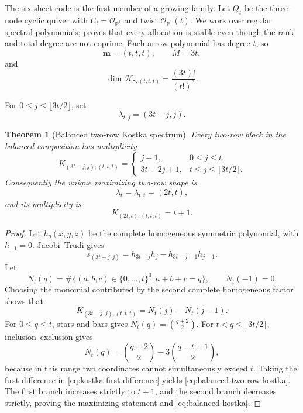 \documentclass[11pt]{article}
\newtheorem{theorem}{Theorem}[section]
\theoremstyle{definition}
\theoremstyle{remark}
\newcommand{\Pp}{\mathbb P}
\newcommand{\cH}{\mathcal H}
\newcommand{\cO}{\mathcal O}
\begin{document}
The six-sheet code is the first member of a growing family.  Let $Q_t$ be the three-node cyclic quiver with $U_i=\cO_{\Pp^1}$ and twist $\cO_{\Pp^1}(t)$.  We work over regular spectral polynomials;  proves that every allocation is stable even though the rank and total degree are not coprime.  Each arrow polynomial has degree $t$, so
\begin{equation}\label{eq:balanced-composition}
 \boldsymbol m=(t,t,t),
 \qquad M=3t,
\end{equation}
and
\begin{equation}\label{eq:balanced-sheet-dim}
 \dim\cH_{\gamma,(t,t,t)}
 =\frac{(3t)!}{(t!)^3}.
\end{equation}

For $0\leq j\leq\lfloor3t/2\rfloor$, set
\begin{equation}\label{eq:balanced-two-row-shape}
 \lambda_{t,j}=(3t-j,j).
\end{equation}

\begin{theorem}[Balanced two-row Kostka spectrum]\label{thm:balanced-two-row}
Every two-row block in the balanced composition has multiplicity
\begin{equation}\label{eq:balanced-two-row-kostka}
 K_{(3t-j,j),(t,t,t)}
 =
 \begin{cases}
  j+1,&0\leq j\leq t,\\
  3t-2j+1,&t\leq j\leq\lfloor3t/2\rfloor.
 \end{cases}
\end{equation}
Consequently the unique maximizing two-row shape is
\begin{equation}\label{eq:balanced-lambda}
 \lambda_t=\lambda_{t,t}=(2t,t),
\end{equation}
and its multiplicity is
\begin{equation}\label{eq:balanced-kostka}
 K_{(2t,t),(t,t,t)}=t+1.
\end{equation}
\end{theorem}

\begin{proof}
Let $h_q(x,y,z)$ be the complete homogeneous symmetric polynomial, with $h_{-1}=0$.  Jacobi--Trudi gives
\[
 s_{(3t-j,j)}
 =h_{3t-j}h_j-h_{3t-j+1}h_{j-1}.
\]
Let
\[
 N_t(q)=\#\{(a,b,c)\in\{0,\ldots,t\}^3:a+b+c=q\},
 \qquad N_t(-1)=0.
\]
Choosing the monomial contributed by the second complete homogeneous factor shows that
\begin{equation}\label{eq:kostka-first-difference}
 K_{(3t-j,j),(t,t,t)}=N_t(j)-N_t(j-1).
\end{equation}
For $0\leq q\leq t$, stars and bars gives $N_t(q)=\binom{q+2}{2}$.  For $t<q\leq\lfloor3t/2\rfloor$, inclusion--exclusion gives
\[
 N_t(q)=\binom{q+2}{2}-3\binom{q-t+1}{2},
\]
because in this range two coordinates cannot simultaneously exceed $t$.  Taking the first difference in \eqref{eq:kostka-first-difference} yields \eqref{eq:balanced-two-row-kostka}.  The first branch increases strictly to $t+1$, and the second branch decreases strictly, proving the maximizing statement and \eqref{eq:balanced-kostka}.
\end{proof}
\end{document}
